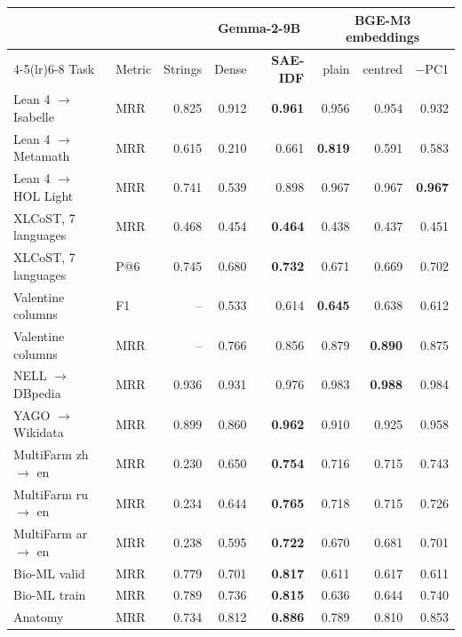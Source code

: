 \begin{tabular}{@{}llrrrrrr@{}}
\toprule
 & & & \multicolumn{2}{c}{Gemma-2-9B} & \multicolumn{3}{c}{BGE-M3 embeddings} \\
\cmidrule(lr){4-5}\cmidrule(lr){6-8}
Task & Metric & Strings & Dense & \textbf{SAE-IDF} & plain & centred & $-$PC1 \\
\midrule
Lean 4 $\to$ Isabelle & MRR & 0.825 & 0.912 & \textbf{0.961} & 0.956 & 0.954 & 0.932 \\
Lean 4 $\to$ Metamath & MRR & 0.615 & 0.210 & 0.661 & \textbf{0.819} & 0.591 & 0.583 \\
Lean 4 $\to$ HOL Light & MRR & 0.741 & 0.539 & 0.898 & 0.967 & 0.967 & \textbf{0.967} \\
XLCoST, 7 languages & MRR & 0.468 & 0.454 & \textbf{0.464} & 0.438 & 0.437 & 0.451 \\
XLCoST, 7 languages & P@6 & 0.745 & 0.680 & \textbf{0.732} & 0.671 & 0.669 & 0.702 \\
Valentine columns & F1 & -- & 0.533 & 0.614 & \textbf{0.645} & 0.638 & 0.612 \\
Valentine columns & MRR & -- & 0.766 & 0.856 & 0.879 & \textbf{0.890} & 0.875 \\
NELL $\to$ DBpedia & MRR & 0.936 & 0.931 & 0.976 & 0.983 & \textbf{0.988} & 0.984 \\
YAGO $\to$ Wikidata & MRR & 0.899 & 0.860 & \textbf{0.962} & 0.910 & 0.925 & 0.958 \\
MultiFarm zh $\to$ en & MRR & 0.230 & 0.650 & \textbf{0.754} & 0.716 & 0.715 & 0.743 \\
MultiFarm ru $\to$ en & MRR & 0.234 & 0.644 & \textbf{0.765} & 0.718 & 0.715 & 0.726 \\
MultiFarm ar $\to$ en & MRR & 0.238 & 0.595 & \textbf{0.722} & 0.670 & 0.681 & 0.701 \\
Bio-ML valid & MRR & 0.779 & 0.701 & \textbf{0.817} & 0.611 & 0.617 & 0.611 \\
Bio-ML train & MRR & 0.789 & 0.736 & \textbf{0.815} & 0.636 & 0.644 & 0.740 \\
Anatomy & MRR & 0.734 & 0.812 & \textbf{0.886} & 0.789 & 0.810 & 0.853 \\
\bottomrule
\end{tabular}
